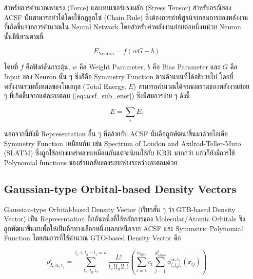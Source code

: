 สำหรับการคำนวณหาแรง (Force) และเทนเซอร์แรงผลัก (Stress Tensor) สำหรับกรณีของ ACSF นั้นสามารถทำได้โดยใช้กฎลูกโซ่ (Chain Rule) 
ซึ่งต้องการทำพิสูจน์จากสมการของพลังงานที่เกิดขึ้นจากการคำนวณใน Neural Network โดยสำหรับค่าพลังงานย่อยต่อหนึ่งหน่วย Neuron นั้นมีนิยามตามนี้

\begin{equation}
    \label{eq:acsf_sub_ener}
    E_{\text{Neuron}} = f(w G + b) 
\end{equation}

\noindent โดยที่ $f$ คือฟังก์ชันกระตุ้น, $w$ คือ Weight Parameter, $b$ คือ Bias Parameter และ $G$ คือ Input ของ Neuron นั้น ๆ 
ซึ่งก็คือ Symmetry Function ตามด้านบนที่ได้อธิบายไป โดยที่พลังงานรวมทั้งหมดของโมเลกุล (Total Energy, $E$) 
สามารถคำนวณได้จากผลรวมของพลังงานย่อย ๆ ที่เกิดขึ้นจากแต่ละอะตอม (\ref{eq:acsf_sub_ener}) ซึ่งมีสมการง่าย ๆ ดังนี้

\begin{equation}
    E = \sum_{i} E_{i}
\end{equation}

นอกจากนี้ยังมี Representation อื่น ๆ ที่คล้ายกับ ACSF นั่นคือถูกพัฒนาขึ้นมาด้วยไอเดีย Symmetry Function เหมือนกัน เช่น 
Spectrum of London and Axilrod-Teller-Muto (SLATM) ซึ่งถูกใช้อย่างแพร่พลายเหมือนกันแต่จะนิยมใช้กับ KRR มากกว่า\cite{faber2018} 
แล้วก็ยังมีการใช้ Polynomial functions ของส่วนกลับของระยะห่างระหว่างอะตอมด้วย\cite{kwac2019,musil2021}

\subsection{Gaussian-type Orbital-based Density Vectors}

Gaussian-type Orbital-based Density Vector (เรียกสั้น ๆ ว่า GTB-based Density Vector) เป็น Representation 
อีกอันหนึ่งที่ใช้หลักการของ Molecular/Atomic Orbitals ซึ่งถูกพัฒนาขึ้นมาเพื่อให้เป็นอีกทางเลือกหนึ่งนอกเหนือจาก ACSF และ 
Symmstric Polynomial Function\cite{kwac2021} โดยสมการที่ใช้คำนวณ GTO-based Density Vector คือ

\begin{equation}
    \rho^{i}_{L,\alpha,r_{s}} = \sum^{l_{x}+l_{y}+l_{z} = L}_{l_{x},l_{y},l_{z}} 
    \frac{L!}{l_{x}!l_{y}!l_{z}!} \left ( \sum^{n_{type}}_{t=1} c_{t} \sum^{N^{t}_{atom}}_{j=1} 
    \phi^{\alpha,r_{s}}_{l_{x}l_{y}l_{z}} (\boldsymbol{r}_{ij}) \right )
\end{equation}

